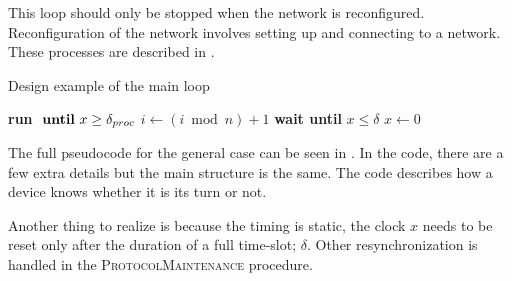 
\noindent%
This loop should only be stopped when the network is reconfigured. 
Reconfiguration of the network involves setting up and connecting to a network. 
These processes are described in .

\begin{algorithm}[ht]
\caption{Design example of the main loop}
\label{lst:general_case}
\begin{algorithmic}[1]
    \Repeat
        \State \textbf{run}  $\text{ \textbf{until} }x \ge \delta_{proc}$ 
        \State $i \gets (i \bmod n) + 1$
            \State {} 
            \State {}
        \Else
                    \State {}
                    \State {}
                \EndIf
            \EndWhile
        \EndIf
        \State \textbf{wait until } $x \le \delta$
        \State $x \gets 0$ 
\EndProcedure        
\end{algorithmic}    
\end{algorithm}

The full pseudocode for the general case can be seen in . 
In the code, there are a few extra details but the main structure is the same. 
The code describes how a device knows whether it is its turn or not.  

Another thing to realize is because the timing is static, the clock $x$ needs to be reset only after the duration of a full time-slot; $\delta$.
Other resynchronization is handled in the \textsc{ProtocolMaintenance} procedure.
            
